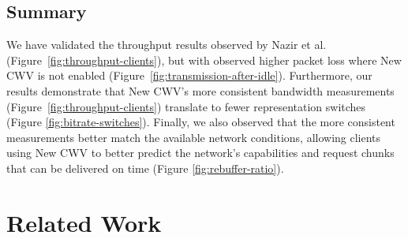 \documentclass[10pt,sigconf,anonymous]{acmart}
\begin{document}
\subsection{Summary}
\label{sec:summary}

We have validated the throughput results observed by Nazir et al.~\cite{Nazir-2014-performance-evaluation-congestion-window-validation-dash-newcwv} (Figure~\ref{fig:throughput-clients}), but with observed higher packet loss where New CWV is not enabled (Figure~\ref{fig:transmission-after-idle}). Furthermore, our results demonstrate that New CWV's more consistent bandwidth measurements (Figure~\ref{fig:throughput-clients}) translate to fewer representation switches (Figure \ref{fig:bitrate-switches}). Finally, we also observed that the more consistent measurements better match the available network conditions, allowing clients using New CWV to better predict the network's capabilities and request chunks that can be delivered on time (Figure \ref{fig:rebuffer-ratio}).


\section{Related Work}
\label{sec:related}
\end{document}
